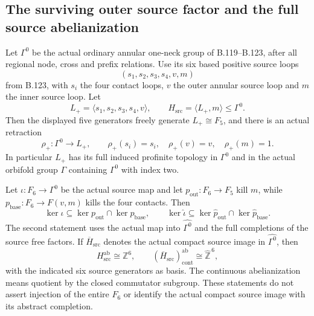 \subsection*{The surviving outer source factor and the full source abelianization}

\label{stmt:B124}
Let $\Gamma^0$ be the actual ordinary annular one-neck group of
B.119--B.123, after all regional node, cross and prefix relations.
Use its six based positive source loops
\[
 (s_1,s_2,s_3,s_4,v,m)
\]
from B.123, with $s_i$ the four contact loops, $v$ the outer annular
source loop and $m$ the inner source loop. Let
\[
 L_+=\langle s_1,s_2,s_3,s_4,v\rangle,\qquad
 H_{\mathrm{src}}=\langle L_+,m\rangle\leq\Gamma^0.
\]
Then the displayed five generators freely generate $L_+\cong F_5$,
and there is an actual retraction
\begin{equation}\label{eq:B124-source-retract}
 \rho_+:\Gamma^0\longrightarrow L_+,
 \qquad \rho_+(s_i)=s_i,
 \quad\rho_+(v)=v,\quad\rho_+(m)=1.
\end{equation}
In particular $L_+$ has its full induced profinite topology in
$\Gamma^0$ and in the actual orbifold group $\Gamma$ containing
$\Gamma^0$ with index two.

Let $\iota:F_6\to\Gamma^0$ be the actual source map and let
$p_{\mathrm{out}}:F_6\to F_5$ kill $m$, while
$p_{\mathrm{base}}:F_6\to F(v,m)$ kills the four contacts. Then
\begin{equation}\label{eq:B124-kernel-bounds}
 \ker\iota\subseteq\ker p_{\mathrm{out}}\cap\ker p_{\mathrm{base}},
 \qquad
 \ker\widehat\iota\subseteq
 \ker\widehat p_{\mathrm{out}}\cap\ker\widehat p_{\mathrm{base}}.
\end{equation}
The second statement uses the actual map into
$\widehat{\Gamma^0}$ and the full completions of the source free
factors. If $\overline H_{\mathrm{src}}$ denotes the actual compact
source image in $\widehat{\Gamma^0}$, then
\begin{equation}\label{eq:B124-source-abelianization}
 H_{\mathrm{src}}^{\mathrm{ab}}\cong\mathbb Z^6,
 \qquad
 (\overline H_{\mathrm{src}})^{\mathrm{ab}}_{\mathrm{cont}}
       \cong\widehat{\mathbb Z}^{\,6},
\end{equation}
with the indicated six source generators as basis. The continuous
abelianization means quotient by the closed commutator subgroup.
These statements do not assert injection of the entire $F_6$ or
identify the actual compact source image with its abstract completion.


